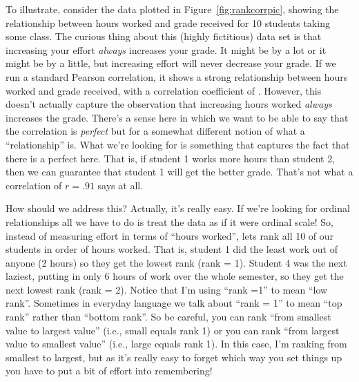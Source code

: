 To illustrate, consider the data plotted in Figure~\ref{fig:rankcorrpic}, showing the relationship between hours worked and grade received for 10 students taking some class. The curious thing about this (highly fictitious) data set is that increasing your effort {\it always} increases your grade. It might be by a lot or it might be by a little, but increasing effort will never decrease your grade. If we run a standard Pearson correlation, it shows a strong relationship between hours worked and grade received, with a correlation coefficient of . However, this doesn't actually capture the observation that increasing hours worked {\it always} increases the grade. There's a sense here in which we want to be able to say that the correlation is {\it perfect} but for a somewhat different notion of what a ``relationship'' is. What we're looking for is something that captures the fact that there is a perfect  here. That is, if student 1 works more hours than student 2, then we can guarantee that student 1 will get the better grade. That's not what a correlation of $r = .91$ says at all.

How should we address this? Actually, it's really easy. If we're looking for ordinal relationships all we have to do is treat the data as if it were ordinal scale! So, instead of measuring effort in terms of ``hours worked'', lets rank all 10 of our students in order of hours worked. That is, student 1 did the least work out of anyone (2 hours) so they get the lowest rank (rank = 1). Student 4 was the next laziest, putting in only 6 hours of work over the whole semester, so they get the next lowest rank (rank = 2). Notice that I'm using ``rank =1'' to mean ``low rank''. Sometimes in everyday language we talk about ``rank = 1'' to mean ``top rank'' rather than ``bottom rank''. So be careful, you can rank ``from smallest value to largest value'' (i.e., small equals rank 1) or you can rank ``from largest value to smallest value'' (i.e., large equals rank 1). In this case, I'm ranking from smallest to largest, but as it's really easy to forget which way you set things up you have to put a bit of effort into remembering! 


